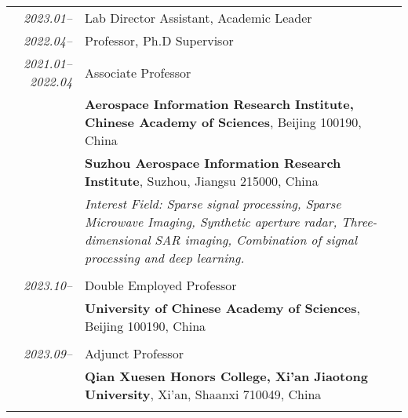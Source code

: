 \documentclass[paper=a4,fontsize=11pt]{scrartcl}
\begin{document}
\begin{tabular}{r|p{12cm}}
	
\emph{2023.01--} & Lab Director Assistant, Academic Leader\\	
\emph{2022.04--} & Professor, Ph.D Supervisor\\	
\emph{2021.01--2022.04} & Associate Professor\\	
	& \normalsize\textbf{Aerospace Information Research Institute, Chinese Academy of Sciences}, Beijing 100190, China\\
	& \normalsize\textbf{Suzhou Aerospace Information Research Institute}, Suzhou, Jiangsu 215000, China\\
	& \emph{Interest Field: Sparse signal processing, Sparse Microwave Imaging, Synthetic aperture radar, Three-dimensional SAR imaging, Combination of signal processing and deep learning.} \\
	\multicolumn{2}{c}{} \\


\emph{2023.10--} & Double Employed Professor\\	
& \normalsize\textbf{University of Chinese Academy of Sciences}, Beijing 100190, China \\
\multicolumn{2}{c}{} \\

\emph{2023.09--} & Adjunct Professor \\	
& \normalsize\textbf{Qian Xuesen Honors College, Xi'an Jiaotong University}, Xi'an, Shaanxi 710049, China \\
\multicolumn{2}{c}{} \\


\end{tabular}
\end{document}
